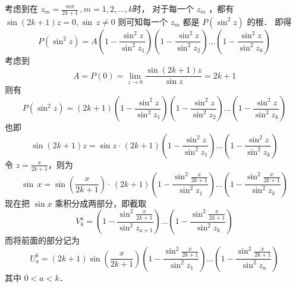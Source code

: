 考虑到在 $z_m=\frac{m\pi}{2k+1}\,,m=1,2,\dots,k $时， 对于每一个 $z_m$ ，都有$ \sin(2k+1)z=0,\sin\,z\ne 0$
则可知每一个 $z_m$ 都是 $P(\sin^2z)$ 的根． 即得
\begin{equation}
P(\sin^2z)=A(1-\frac{\sin^2z}{\sin^2z_1})(1-\frac{\sin^2z}{\sin^2z_2})\dots(1-\frac{\sin^2z}{\sin^2z_k})
\end{equation}
考虑到
\begin{equation}
A=P(0)=\lim_{z\rightarrow0}\frac{\sin(2k+1)z}{\sin z}=2k+1
\end{equation}
则有
\begin{equation}
P(\sin^2z)=(2k+1)(1-\frac{\sin^2z}{\sin^2z_1})(1-\frac{\sin^2z}{\sin^2z_2})\dots(1-\frac{\sin^2z}{\sin^2z_k})
\end{equation}
也即
\begin{equation}
\sin(2k+1)z=\sin z\cdot\,(2k+1)(1-\frac{\sin^2z}{\sin^2z_1})\dots(1-\frac{\sin^2z}{\sin^2z_k})
\end{equation}
令 $z=\frac{x}{2k+1}$，则为
\begin{equation}
\sin\,x=\sin(\frac x{2k+1})\cdot\,(2k+1)(1-\frac{\sin^2\frac x{2k+1}}{\sin^2z_1})\dots(1-\frac{\sin^2\frac x{2k+1}}{\sin^2z_k})
\end{equation}
现在把 $\sin x$ 乘积分成两部分，即截取
\begin{equation}
V^a_k=(1-\frac{\sin^2\frac x{2k+1}}{\sin^2z_{a+1}})\dots(1-\frac{\sin^2\frac x{2k+1}}{\sin^2z_k})
\end{equation}
而将前面的部分记为
\begin{equation}
U^k_a=(2k+1)\sin(\frac x{2k+1})(1-\frac{\sin^2\frac x{2k+1}}{\sin^2z_1})\dots(1-\frac{\sin^2\frac x{2k+1}}{\sin^2z_{a}})
\end{equation}
其中 $0<a<k $．

